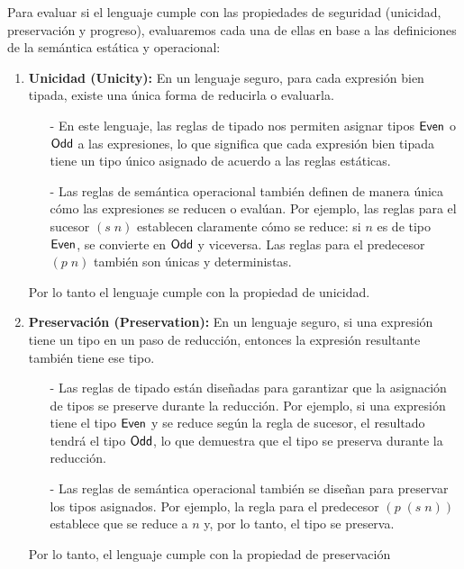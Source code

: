 \documentclass{article}
\begin{document}
\begin{enumerate}
\begin{enumerate}
            Para evaluar si el lenguaje cumple con las propiedades de seguridad (unicidad, preservación y progreso), evaluaremos cada una de ellas en base a las definiciones de la semántica estática y operacional:

            \begin{enumerate}
                \item \textbf{Unicidad (Unicity):} En un lenguaje seguro, para cada expresión bien tipada, existe una única forma de reducirla o evaluarla.
                \begin{itemize}
                    \item[-] En este lenguaje, las reglas de tipado nos permiten asignar tipos ${\sf Even}$ o ${\sf Odd}$ a las expresiones, lo que significa que cada expresión bien tipada tiene un tipo único asignado de acuerdo a las reglas estáticas.
                    \item[-] Las reglas de semántica operacional también definen de manera única cómo las expresiones se reducen o evalúan. Por ejemplo, las reglas para el sucesor $(s\;n)$ establecen claramente cómo se reduce: si $n$ es de tipo ${\sf Even}$, se convierte en ${\sf Odd}$ y viceversa. Las reglas para el predecesor $(p\;n)$ también son únicas y deterministas.
                \end{itemize}
                Por lo tanto el lenguaje cumple con la propiedad de unicidad.

                \item \textbf{Preservación (Preservation):} En un lenguaje seguro, si una expresión tiene un tipo en un paso de reducción, entonces la expresión resultante también tiene ese tipo.
                \begin{itemize}
                    \item[-] Las reglas de tipado están diseñadas para garantizar que la asignación de tipos se preserve durante la reducción. Por ejemplo, si una expresión tiene el tipo ${\sf Even}$ y se reduce según la regla de sucesor, el resultado tendrá el tipo ${\sf Odd}$, lo que demuestra que el tipo se preserva durante la reducción.

                    \item[-] Las reglas de semántica operacional también se diseñan para preservar los tipos asignados. Por ejemplo, la regla para el predecesor $(p\;(s\;n))$ establece que se reduce a $n$ y, por lo tanto, el tipo se preserva.
                \end{itemize}
                Por lo tanto, el lenguaje cumple con la propiedad de preservación


\end{enumerate}
\end{enumerate}
\end{enumerate}
\end{document}
